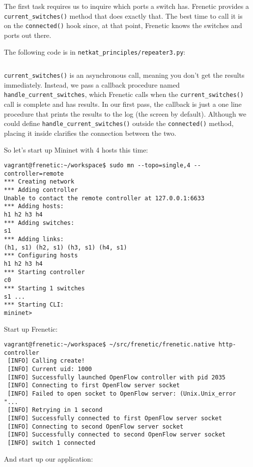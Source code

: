 The first task requires us to inquire which ports a switch has.  Frenetic provides a \texttt{current\_switches()}
method that does exactly that.   The best time to call it is on the \texttt{connected()} hook since, at that
point, Frenetic knows the switches and ports out there.

The following code is in \texttt{netkat\_principles/repeater3.py}:

\inputminted{python}{code/netkat_principles/repeater3.py}

\texttt{current\_switches()} is an asynchronous call, meaning you don't get the results immediately.
Instead, we pass a callback procedure named \texttt{handle\_current\_switches}, which Frenetic calls
when the \texttt{current\_switches()} call is complete and has results.  In our first pass, the callback
is just a one line procedure that prints the results to the log (the screen by default).  Although
we could define \texttt{handle\_current\_switches()} outside the \texttt{connected()} method, placing
it inside clarifies the connection between the two.  

So let's start up Mininet with 4 hosts this time:

\begin{verbatim}
vagrant@frenetic:~/workspace$ sudo mn --topo=single,4 --controller=remote
*** Creating network
*** Adding controller
Unable to contact the remote controller at 127.0.0.1:6633
*** Adding hosts:
h1 h2 h3 h4
*** Adding switches:
s1
*** Adding links:
(h1, s1) (h2, s1) (h3, s1) (h4, s1)
*** Configuring hosts
h1 h2 h3 h4
*** Starting controller
c0
*** Starting 1 switches
s1 ...
*** Starting CLI:
mininet>
\end{verbatim}

Start up Frenetic:

\begin{verbatim}
vagrant@frenetic:~/workspace$ ~/src/frenetic/frenetic.native http-controller
 [INFO] Calling create!
 [INFO] Current uid: 1000
 [INFO] Successfully launched OpenFlow controller with pid 2035
 [INFO] Connecting to first OpenFlow server socket
 [INFO] Failed to open socket to OpenFlow server: (Unix.Unix_error "...
 [INFO] Retrying in 1 second
 [INFO] Successfully connected to first OpenFlow server socket
 [INFO] Connecting to second OpenFlow server socket
 [INFO] Successfully connected to second OpenFlow server socket
 [INFO] switch 1 connected
\end{verbatim}

And start up our application:

